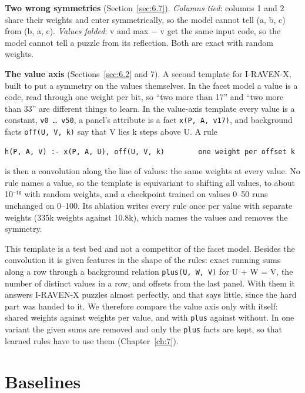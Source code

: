\textbf{Two wrong symmetries} (Section~\ref{sec:6.7}). \emph{Columns tied}: columns 1 and 2 share their weights and enter symmetrically, so the model cannot tell (a, b, c) from (b, a, c). \emph{Values folded}: v and max − v get the same input code, so the model cannot tell a puzzle from its reflection. Both are exact with random weights.

\textbf{The value axis} (Sections~\ref{sec:6.2} and 7). A second template for I-RAVEN-X, built to put a symmetry on the values themselves. In the facet model a value is a code, read through one weight per bit, so ``two more than 17'' and ``two more than 33'' are different things to learn. In the value-axis template every value is a constant, \texttt{v0 … v50}, a panel's attribute is a fact \texttt{x(P, A, v17)}, and background facts \texttt{off(U, V, k)} say that V lies k steps above U. A rule

\begin{Verbatim}[fontsize=\small,breaklines]
h(P, A, V) :- x(P, A, U), off(U, V, k)        one weight per offset k
\end{Verbatim}

is then a convolution along the line of values: the same weights at every value. No rule names a value, so the template is equivariant to shifting all values, to about 10⁻¹⁶ with random weights, and a checkpoint trained on values 0–50 runs unchanged on 0–100. Its ablation writes every rule once per value with separate weights (335k weights against 10.8k), which names the values and removes the symmetry.

This template is a test bed and not a competitor of the facet model. Besides the convolution it is given features in the shape of the rules: exact running sums along a row through a background relation \texttt{plus(U, W, V)} for U + W = V, the number of distinct values in a row, and offsets from the last panel. With them it answers I-RAVEN-X puzzles almost perfectly, and that says little, since the hard part was handed to it. We therefore compare the value axis only with itself: shared weights against weights per value, and with \texttt{plus} against without. In one variant the given sums are removed and only the \texttt{plus} facts are kept, so that learned rules have to use them (Chapter~\ref{ch:7}).

\section{Baselines}\label{sec:4.6}

